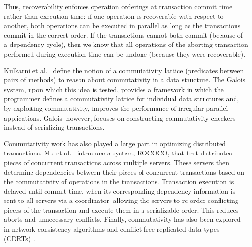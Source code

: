 Thus, recoverability enforces operation orderings at transaction commit time rather than execution time: if one operation is recoverable with respect to another, both operations can be executed in parallel as long as the transactions commit in the correct order. If the transactions cannot both commit (because of a dependency cycle), then we know that all operations of the aborting transaction performed during execution time can be undone (because they were recoverable).

Kulkarni et al.~\cite{galois} define the notion of a commutativity lattice (predicates between pairs of methods) to reason about commutativity in a data structure. The Galois system, upon which this idea is tested, provides a framework in which the programmer defines a commutativity lattice for individual data structures and, by exploiting commutativity, improves the performance of irregular parallel applications. Galois, however, focuses on constructing commutativity checkers instead of serializing transactions.

Commutativity work has also played a large part in optimizing distributed transactions. Mu et al.~\cite{distributed} introduce a system, ROCOCO, that first distributes pieces of concurrent transactions across multiple servers. These servers then determine dependencies between their pieces of concurrent transactions based on the commutativity of operations in the transactions.
 Transaction execution is delayed until commit time, when its corresponding dependency information is sent to all servers via a coordinator, allowing the servers to re-order conflicting pieces of the transaction and execute them in a serializable order. This reduces aborts and unnecessary conflicts.
Finally, commutativity has also been explored in network consistency algorithms and conflict-free replicated data types (CDRTs)~\cite{CRDT}.
